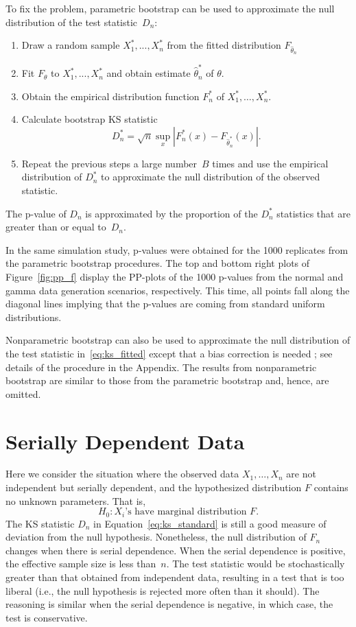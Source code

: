 \documentclass[12pt, letterpaper, titlepage]{article}
\begin{document}
To fix the problem, parametric bootstrap can be used to approximate the null
distribution of the test statistic~$D_n$:
\begin{enumerate}
\item
  Draw a random sample $X_1^*,...,X_n^*$ from the fitted distribution
  $F_{\hat\theta_n}$
\item
  Fit $F_\theta$ to $X_1^*,...,X_n^*$ and obtain estimate 
	$\hat\theta_n^*$ of $\theta$.
\item
  Obtain the empirical distribution function $F_n^*$ of
  $X_1^*, \ldots,  X_n^*$.
\item
  Calculate bootstrap KS statistic
  \[
    D_n^* = \sqrt{n} \sup_x | F_n^* (x)- F_{\hat\theta_n^*}(x) |.
  \]
\item
  Repeat the previous steps a large number~$B$ times and use the empirical
  distribution of $D_n^*$ to approximate the null distribution of the observed
  statistic.
\end{enumerate}
The p-value of $D_n$ is approximated by the proportion of the $D_n^*$ 
statistics that are greater than or equal to~$D_n$.


In the same simulation study, p-values were obtained for the 1000 replicates
from the parametric bootstrap procedures. The top and bottom right plots of 
Figure~\ref{fig:pp_f} display the PP-plots of the 1000
p-values from the normal and gamma data generation scenarios,
respectively. This time, all points fall along the diagonal lines implying that
the p-values are coming from standard uniform distributions.


Nonparametric bootstrap can also be used to approximate the null distribution
of the test statistic in~\eqref{eq:ks_fitted} except that a bias correction is 
needed \citep{babu2004goodness}; see details of the procedure
in the Appendix. The results from nonparametric bootstrap are similar to those
from the parametric bootstrap and, hence, are omitted.




\section{Serially Dependent Data}
\label{sec:dependence}

Here we consider the situation where the observed data $X_1, \ldots, X_n$ are
not independent but serially dependent, and the hypothesized distribution $F$
contains no unknown parameters. That is,
\[
H_0: \text{$X_i$'s have marginal distribution $F$.}
\]
The KS statistic $D_n$ in Equation~\eqref{eq:ks_standard}
is still a good measure of deviation from the null hypothesis. Nonetheless, the
null distribution of $F_n$ changes when there is serial dependence.
When the serial dependence is
positive, the effective sample size is less than~$n$. The test statistic
would be stochastically greater than that obtained from independent data, 
resulting in a test that is too liberal (i.e., the null hypothesis is rejected
more often than it should). The reasoning is similar when the serial dependence 
is negative, in which case, the test is conservative.
\end{document}
